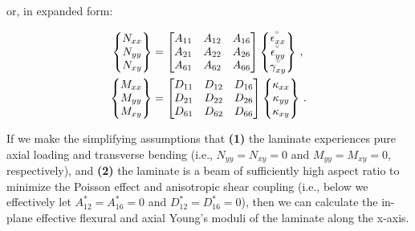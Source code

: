 \documentclass[twocolumn, linenumbers, superscriptaddress, nofootinbib]{revtex4-1}
\begin{document}
				or, in expanded form:
				
				\begin{equation}
					\begin{aligned}
						\begin{Bmatrix}
							N_{xx} \\
							N_{yy} \\
							N_{xy}
						\end{Bmatrix}
						& =
						\begin{bmatrix}
							A_{11} & A_{12} & A_{16} \\
							A_{21} & A_{22} & A_{26} \\
							A_{61} & A_{62} & A_{66}
						\end{bmatrix}
						\begin{Bmatrix}
							\epsilon^{\degree}_{xx} \\
							\epsilon^{\degree}_{yy} \\
							\gamma^{\degree}_{xy}
						\end{Bmatrix}\,,
						\\
						\begin{Bmatrix}
							M_{xx} \\
							M_{yy} \\
							M_{xy}
						\end{Bmatrix}
						& =
						\begin{bmatrix}
							D_{11} & D_{12} & D_{16} \\
							D_{21} & D_{22} & D_{26} \\
							D_{61} & D_{62} & D_{66}
						\end{bmatrix}
						\begin{Bmatrix}
							\kappa_{xx} \\
							\kappa_{yy} \\
							\kappa_{xy}
						\end{Bmatrix}\,.
					\end{aligned}
				\end{equation}
				
				If we make the simplifying assumptions \cite{Jones2014, Reddy2004} that \textbf{(1)} the laminate experiences pure axial loading and transverse bending (i.e., $N_{yy} = N_{xy} = 0$ and $M_{yy} = M_{xy} = 0$, respectively), and \textbf{(2)} the laminate is a beam of sufficiently high aspect ratio to minimize the Poisson effect and anisotropic shear coupling (i.e., below we effectively let $A^*_{12} = A^*_{16} = 0$ and $D^*_{12} = D^*_{16} = 0$), then we can calculate the in-plane effective flexural and axial Young's moduli of the laminate along the x-axis.
				
\end{document}
